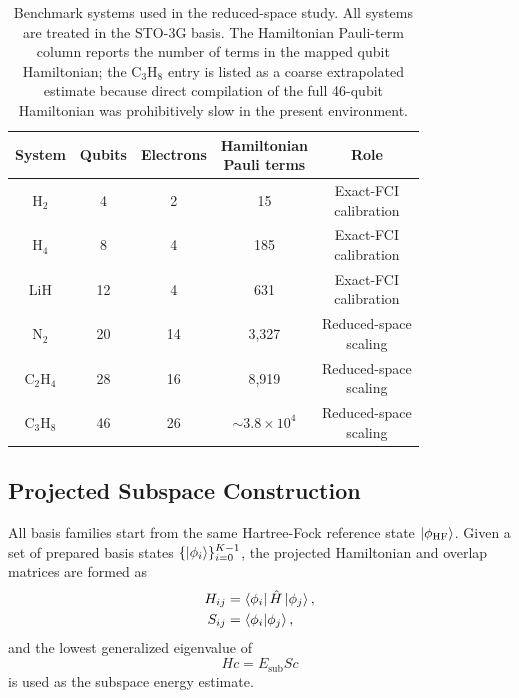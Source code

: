 \begin{table}[t]
\caption{Benchmark systems used in the reduced-space study. All systems are treated in the STO-3G basis. The Hamiltonian Pauli-term column reports the number of terms in the mapped qubit Hamiltonian; the C$_3$H$_8$ entry is listed as a coarse extrapolated estimate because direct compilation of the full 46-qubit Hamiltonian was prohibitively slow in the present environment.}
\label{tab:benchmark-systems}
\begin{ruledtabular}
\scriptsize
\setlength{\tabcolsep}{3pt}
\begin{tabular}{@{}ccccc@{}}
System & Qubits & Electrons & \makecell[c]{Hamiltonian\\Pauli terms} & Role \\
\midrule
H$_2$ & 4 & 2 & 15 & \makecell[c]{Exact-FCI\\calibration} \\
H$_4$ & 8 & 4 & 185 & \makecell[c]{Exact-FCI\\calibration} \\
LiH & 12 & 4 & 631 & \makecell[c]{Exact-FCI\\calibration} \\
N$_2$ & 20 & 14 & 3,327 & \makecell[c]{Reduced-space\\scaling} \\
C$_2$H$_4$ & 28 & 16 & 8,919 & \makecell[c]{Reduced-space\\scaling} \\
C$_3$H$_8$ & 46 & 26 & $\sim 3.8\times 10^4$ & \makecell[c]{Reduced-space\\scaling} \\
\end{tabular}
\end{ruledtabular}
\end{table}

\subsection{Projected Subspace Construction}

All basis families start from the same Hartree-Fock reference state $\ket{\phi_{\mathrm{HF}}}$. Given a set of prepared basis states $\{\ket{\phi_i}\}_{i=0}^{K-1}$, the projected Hamiltonian and overlap matrices are formed as
\begin{align}
H_{ij} &= \bra{\phi_i}\hat{H}\ket{\phi_j}, \\
S_{ij} &= \braket{\phi_i|\phi_j},
\end{align}
and the lowest generalized eigenvalue of
\begin{equation}
Hc = E_{\mathrm{sub}} Sc
\end{equation}
is used as the subspace energy estimate.

